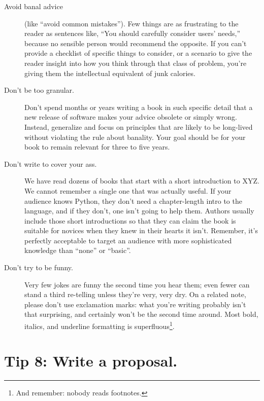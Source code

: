 \documentclass[10pt,letterpaper]{article}
\begin{document}
\begin{description}

\item[Avoid banal advice]
  (like ``avoid common mistakes'').
  Few things are as frustrating to the reader as sentences like,
  ``You should carefully consider users' needs,''
  because no sensible person would recommend the opposite.
  If you can't provide a checklist of specific things to consider,
  or a scenario to give the reader insight into how you think through that class of problem,
  you're giving them the intellectual equivalent of junk calories.
  
\item[Don't be too granular.]
  Don't spend months or years writing a book in such specific detail
  that a new release of software makes your advice obsolete or simply wrong.
  Instead, generalize and focus on principles that are likely to be long-lived
  without violating the rule about banality.
  Your goal should be for your book to remain relevant for three to five years.
  
\item[Don't write to cover your ass.]
  We have read dozens of books that start with a short introduction to XYZ.
  We cannot remember a single one that was actually useful.
  If your audience knows Python,
  they don't need a chapter-length intro to the language,
  and if they don't,
  one isn't going to help them.
  Authors usually include those short introductions
  so that they can claim the book is suitable for novices
  when they knew in their hearts it isn't.
  Remember,
  it's perfectly acceptable to target an audience with more sophisticated knowledge
  than ``none'' or ``basic''.
  
\item[Don't try to be funny.]
  Very few jokes are funny the second time you hear them;
  even fewer can stand a third re-telling unless they're very, very dry.
  On a related note,
  please don't use exclamation marks:
  what you're writing probably isn't that surprising,
  and certainly won't be the second time around.
  Most bold, italics, and underline formatting is superfluous\footnote{And remember: nobody reads footnotes.}.

\end{description}

\section*{Tip 8: Write a proposal.}
\end{document}
